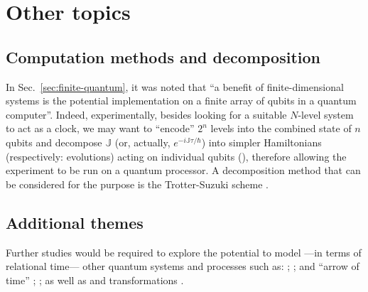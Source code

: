 \section{Other topics}\label{sec:outlook-misc}

\subsection{Computation methods and decomposition}

In Sec.~\ref{sec:finite-quantum}, it was noted that
``a benefit of finite-dimensional systems is the potential implementation on a finite array of
qubits in a quantum computer''.
Indeed,
experimentally,
besides looking for a suitable $N$-level system to act as a clock,
we may want to ``encode'' $2^{n}$ levels into the combined state of $n$
qubits and
decompose $\mathbb{J}$ (or, actually, $e^{-i\mathbb{J}\tau/\hbar}$)
into simpler Hamiltonians (respectively: evolutions)
acting on individual qubits (),
therefore allowing the experiment to be run on a quantum processor.
A decomposition method that can be considered for the purpose
is the Trotter-Suzuki scheme
\parencite{Trotter-Suzuki:exp, Trotter-Suzuki:GPU}.

\subsection{Additional themes}

Further studies
would be required to explore the potential to model
---in terms of relational time---
other quantum systems and processes such as:
%
 \parencite{crystal2,crystal3,crystal2012};
%
 \parencite{TQM2};
%
 and ``arrow of time'' \parencite{Josset_Thermo};
%
 \parencite{Souza_Spontaneous};
%
as well as
 and transformations \parencite{Adlam_ReferenceFrames}.
